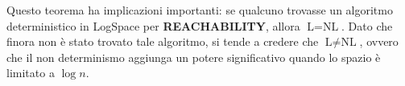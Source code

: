 \documentclass[a4paper]{article}
\theoremstyle{definition} %
\begin{document}
Questo teorema ha implicazioni importanti: se qualcuno trovasse un algoritmo deterministico in LogSpace per \textbf{REACHABILITY}, allora $\text{L} = \text{NL}$. Dato che finora non è stato trovato tale algoritmo, si tende a credere che $\text{L} \ne \text{NL}$, ovvero che il non determinismo aggiunga un potere significativo quando lo spazio è limitato a $\log n$.
\end{document}
